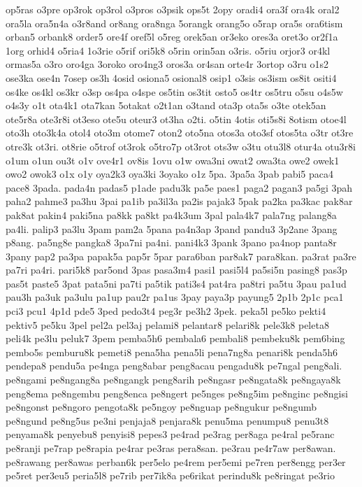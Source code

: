 {op5ras o3pre op3rok op3rol o3pros o3psik ops5t 2opy oradi4 ora3f ora4k
oral2 ora5la ora5n4a o3r8and or8ang ora8nga 5orangk orang5o o5rap ora5s
ora6tism orban5 orbank8 order5 ore4f oref5l o5reg orek5an or3eko ores3a
oret3o or2f1a 1org orhid4 o5ria4 1o3rie o5rif ori5k8 o5rin orin5an o3ris.
o5riu orjor3 or4kl ormas5a o3ro oro4ga 3oroko oro4ng3 oros3a or4san orte4r
3ortop o3ru o1s2 ose3ka ose4n 7osep os3h 4osid osiona5 osional8 osip1
o3sis os3ism os8it ositi4 os4ke os4kl os3kr o3sp os4pa o4spe os5tin os3tit
osto5 os4tr os5tru o5su o4s5w o4s3y o1t ota4k1 ota7kan 5otakat o2t1an
o3tand ota3p ota5s o3te otek5an ote5r8a ote3r8i ot3eso ote5u oteur3 ot3ha
o2ti. o5tin 4otis oti5s8i 8otism otoe4l oto3h oto3k4a otol4 oto3m otome7
oton2 oto5na otos3a oto3sf otos5ta o3tr ot3re otre3k ot3ri. ot8rie o5trof
ot3rok o5tro7p ot3rot ots3w o3tu otu3l8 otur4a otu3r8i o1um o1un ou3t o1v
ove4r1 ov8is 1ovu o1w owa3ni owat2 owa3ta owe2 owek1 owo2 owok3 o1x o1y
oya2k3 oya3ki 3oyako o1z 5pa. 3pa5a 3pab pabi5 paca4 pace8 3pada. pada4n
padas5 p1ade padu3k pa5e paes1 paga2 pagan3 pa5gi 3pah paha2 pahme3 pa3hu
3pai pa1ib pa3il3a pa2is pajak3 5pak pa2ka pa3kac pak8ar pak8at pakin4
paki5na pa8kk pa8kt pa4k3um 3pal pala4k7 pala7ng palang8a pa4li. palip3
pa3lu 3pam pam2a 5pana pa4n3ap 3pand pandu3 3p2ane 3pang p8ang. pa5ng8e
pangka8 3pa7ni pa4ni. pani4k3 3pank 3pano pa4nop panta8r 3pany pap2 pa3pa
papak5a pap5r 5par para6ban par8ak7 para8kan. pa3rat pa3re pa7ri pa4ri.
pari5k8 par5ond 3pas pasa3m4 pasi1 pasi5l4 pa5si5n pasing8 pas3p pas5t
paste5 3pat pata5ni pa7ti pa5tik pati3s4 pat4ra pa8tri pa5tu 3pau pa1ud
pau3h pa3uk pa3ulu pa1up pau2r pa1us 3pay paya3p payung5 2p1b 2p1c pca1
pci3 pcu1 4p1d pde5 3ped pedo3t4 peg3r pe3h2 3pek. peka5l pe5ko pekti4
pektiv5 pe5ku 3pel pel2a pel3aj pelami8 pelantar8 pelari8k pele3k8 peleta8
peli4k pe3lu peluk7 3pem pemba5h6 pembala6 pembali8 pembeku8k pem6bing
pembo5s pemburu8k pemeti8 pena5ha pena5li pena7ng8a penari8k penda5h6
pendepa8 pendu5a pe4nga peng8abar peng8acau pengadu8k pe7ngal peng8ali.
pe8ngami pe8ngang8a pe8ngangk peng8arih pe8ngasr pe8ngata8k pe8ngaya8k
peng8ema pe8ngembu peng8enca pe8ngert pe5nges pe8ng5im pe8nginc pe8ngisi
pe8ngonst pe8ngoro pengota8k pe5ngoy pe8nguap pe8ngukur pe8ngumb pe8ngund
pe8ng5us pe3ni penjaja8 penjara8k penu5ma penumpu8 penu3t8 penyama8k
penyebu8 penyisi8 pepes3 pe4rad pe3rag per8aga pe4ral pe5ranc pe8ranji
pe7rap pe8rapia pe4rar pe3ras pera8san. pe3rau pe4r7aw per8awan. pe8rawang
per8awas perban6k per5elo pe4rem per5emi pe7ren per8engg per3er pe5ret
per3eu5 peria5l8 pe7rib per7ik8a pe6rikat perindu8k pe8ringat pe3rio
}
